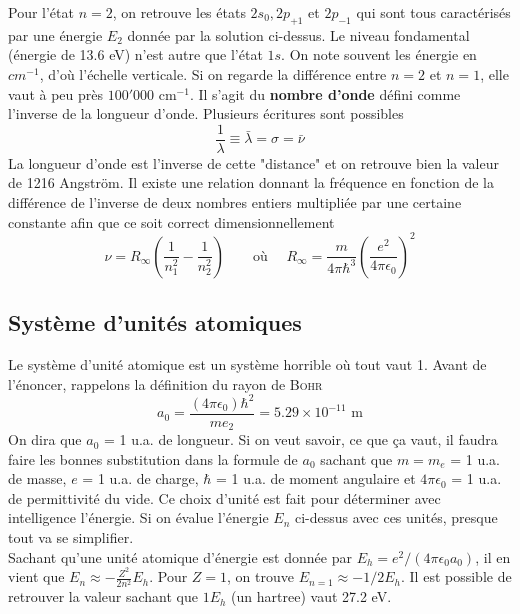	Pour l'état $n=2$, on retrouve les états $2s_0, 2p_{+1}$ et $2p_{-1}$ qui sont tous caractérisés par
	une énergie $E_2$ donnée par la solution ci-dessus. Le niveau fondamental (énergie de 13.6 eV) n'est 
	autre que l'état $1s$. On note souvent les énergie en $cm^{-1}$, d'où l'échelle verticale. Si on regarde
	la différence entre $n=2$ et $n=1$, elle vaut à peu près $100'000$ cm$^{-1}$. Il s'agit du \textbf{
	nombre d'onde} défini comme l'inverse de la longueur d'onde. Plusieurs écritures sont possibles
	\begin{equation}
	\frac{1}{\lambda}\equiv \bar\lambda = \sigma = \bar\nu
	\end{equation}
	La longueur d'onde est l'inverse de cette "distance" et on retrouve bien la valeur de 1216 Angström. 
	Il existe une relation donnant la fréquence en fonction de la différence de l'inverse de deux nombres 
	entiers multipliée par une certaine constante afin que ce soit correct dimensionnellement
	\begin{equation}
	\nu = R_\infty\left(\frac{1}{n_1^2}-\frac{1}{n_2^2}\right)\qquad\text{où }\quad R_\infty = \frac{m}{
	4\pi\hbar^3}\left(\frac{e^2}{4\pi\epsilon_0}\right)^2
	\end{equation}
	

\subsection{Système d'unités atomiques}
Le système d'unité atomique est un système horrible où tout vaut 1. Avant de l'énoncer, rappelons la 
définition du rayon de \textsc{Bohr}
\begin{equation}
a_0=\frac{(4\pi\epsilon_0)\hbar^2}{me_2} = 5.29\times 10^{-11}\text{ m}
\end{equation}
On dira que $a_0$ = 1 u.a. de longueur. Si on veut savoir, ce que ça vaut, il faudra faire les bonnes
substitution dans la formule de $a_0$ sachant que
$m=m_e$ = 1 u.a. de masse, $e$ = 1 u.a. de charge, $\hbar$ = 1 u.a. de moment angulaire et $4\pi\epsilon_0$ =
1 u.a.  de permittivité du vide. Ce choix d'unité est fait pour déterminer avec intelligence l'énergie. Si on 
évalue l'énergie $E_n$ ci-dessus avec ces unités, presque tout va se simplifier.\\

Sachant qu'une unité atomique d'énergie est donnée par $E_h = e^2/(4\pi\epsilon_0 a_0)$, il en vient que
$E_n \approx -\frac{Z^2}{2n^2}E_h$. Pour $Z=1$, on trouve $E_{n=1} \approx -1/2 E_h$. Il est possible de 
retrouver la valeur sachant que $1 E_h$ (un hartree) vaut 27.2 eV.\\

